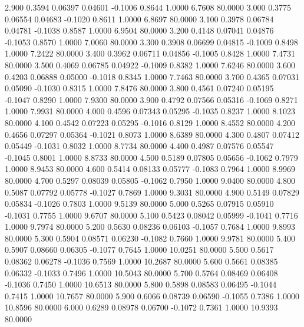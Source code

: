    2.900   0.3594   0.06397   0.04601  -0.1006   0.8644   1.0000   6.7608  80.0000
   3.000   0.3775   0.06554   0.04683  -0.1020   0.8611   1.0000   6.8697  80.0000
   3.100   0.3978   0.06784   0.04781  -0.1038   0.8587   1.0000   6.9504  80.0000
   3.200   0.4148   0.07041   0.04876  -0.1053   0.8570   1.0000   7.0060  80.0000
   3.300   0.3908   0.06699   0.04815  -0.1009   0.8498   1.0000   7.2422  80.0000
   3.400   0.3962   0.06711   0.04856  -0.1005   0.8428   1.0000   7.4731  80.0000
   3.500   0.4069   0.06785   0.04922  -0.1009   0.8382   1.0000   7.6246  80.0000
   3.600   0.4203   0.06888   0.05000  -0.1018   0.8345   1.0000   7.7463  80.0000
   3.700   0.4365   0.07031   0.05090  -0.1030   0.8315   1.0000   7.8476  80.0000
   3.800   0.4561   0.07240   0.05195  -0.1047   0.8290   1.0000   7.9300  80.0000
   3.900   0.4792   0.07566   0.05316  -0.1069   0.8271   1.0000   7.9931  80.0000
   4.000   0.4596   0.07343   0.05295  -0.1035   0.8237   1.0000   8.1023  80.0000
   4.100   0.4542   0.07223   0.05295  -0.1016   0.8129   1.0000   8.4552  80.0000
   4.200   0.4656   0.07297   0.05364  -0.1021   0.8073   1.0000   8.6389  80.0000
   4.300   0.4807   0.07412   0.05449  -0.1031   0.8032   1.0000   8.7734  80.0000
   4.400   0.4987   0.07576   0.05547  -0.1045   0.8001   1.0000   8.8733  80.0000
   4.500   0.5189   0.07805   0.05656  -0.1062   0.7979   1.0000   8.9453  80.0000
   4.600   0.5414   0.08133   0.05777  -0.1083   0.7964   1.0000   8.9969  80.0000
   4.700   0.5297   0.08039   0.05805  -0.1062   0.7950   1.0000   9.0400  80.0000
   4.800   0.5087   0.07792   0.05778  -0.1027   0.7869   1.0000   9.3031  80.0000
   4.900   0.5149   0.07829   0.05834  -0.1026   0.7803   1.0000   9.5139  80.0000
   5.000   0.5265   0.07915   0.05910  -0.1031   0.7755   1.0000   9.6707  80.0000
   5.100   0.5423   0.08042   0.05999  -0.1041   0.7716   1.0000   9.7974  80.0000
   5.200   0.5630   0.08236   0.06103  -0.1057   0.7684   1.0000   9.8993  80.0000
   5.300   0.5904   0.08571   0.06230  -0.1082   0.7660   1.0000   9.9781  80.0000
   5.400   0.5907   0.08660   0.06305  -0.1077   0.7645   1.0000  10.0251  80.0000
   5.500   0.5617   0.08362   0.06278  -0.1036   0.7569   1.0000  10.2687  80.0000
   5.600   0.5661   0.08385   0.06332  -0.1033   0.7496   1.0000  10.5043  80.0000
   5.700   0.5764   0.08469   0.06408  -0.1036   0.7450   1.0000  10.6513  80.0000
   5.800   0.5898   0.08583   0.06495  -0.1044   0.7415   1.0000  10.7657  80.0000
   5.900   0.6066   0.08739   0.06590  -0.1055   0.7386   1.0000  10.8596  80.0000
   6.000   0.6289   0.08978   0.06700  -0.1072   0.7361   1.0000  10.9393  80.0000
